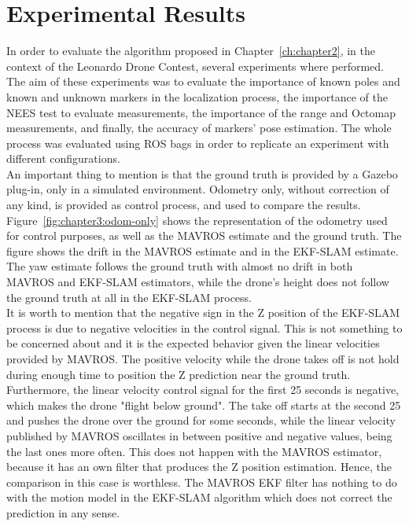 \chapter{Experimental Results}
\label{ch:chapter3}
In order to evaluate the algorithm proposed in Chapter~\ref{ch:chapter2}, in the context of the Leonardo Drone Contest, several experiments where performed. The aim of these experiments was to evaluate the importance of known poles and known and unknown markers in the localization process, the importance of the \ac{NEES} test to evaluate measurements, the importance of the range and Octomap measurements, and finally, the accuracy of markers' pose estimation. The whole process was evaluated using \ac{ROS} bags in order to replicate an experiment with different configurations.\\

An important thing to mention is that the ground truth is provided by a Gazebo plug-in, only in a simulated environment. Odometry only, without correction of any kind, is provided as control process, and used to compare the results. \\

Figure~\ref{fig:chapter3:odom-only} shows the representation of the odometry used for control purposes, as well as the MAVROS estimate and the ground truth. The figure shows the drift in the MAVROS estimate and in the EKF-SLAM estimate. The yaw estimate follows the ground truth with almost no drift in both MAVROS and EKF-SLAM estimators, while the drone's height does not follow the ground truth at all in the EKF-SLAM process.\\

It is worth to mention that the negative sign in the Z position of the EKF-SLAM process is due to negative velocities in the control signal. This is not something to be concerned about and it is the expected behavior given the linear velocities provided by MAVROS. The positive velocity while the drone takes off is not hold during enough time to position the Z prediction near the ground truth. Furthermore, the linear velocity control signal for the first 25 seconds is negative, which makes the drone "flight below ground". The take off starts at the second 25 and pushes the drone over the ground for some seconds, while the linear velocity published by MAVROS oscillates in between positive and negative values, being the last ones more often. This does not happen with the MAVROS estimator, because it has an own filter that produces the Z position estimation. Hence, the comparison in this case is worthless. The MAVROS \ac{EKF} filter has nothing to do with the motion model in the EKF-SLAM algorithm which does not correct the prediction in any sense.\\


